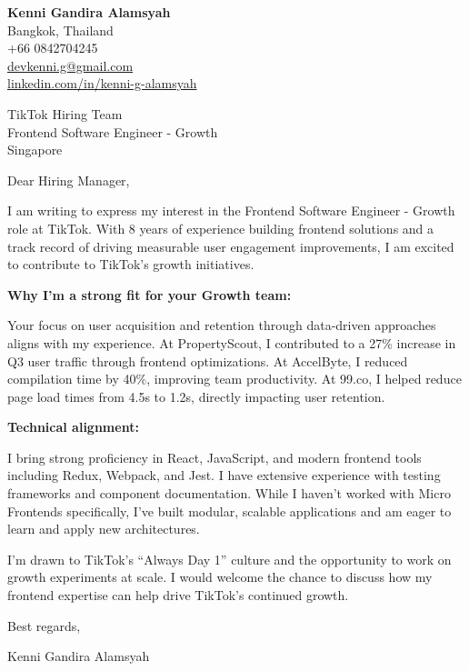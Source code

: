 \documentclass[12pt]{article}
\begin{document}
\begin{flushleft}
\textbf{\Large Kenni Gandira Alamsyah}\\
Bangkok, Thailand\\
+66 0842704245\\
\href{mailto:devkenni.g@gmail.com}{devkenni.g@gmail.com}\\
\href{https://www.linkedin.com/in/kenni-g-alamsyah}{linkedin.com/in/kenni-g-alamsyah}
\end{flushleft}

\vspace{1em}

\begin{flushleft}
TikTok Hiring Team\\
Frontend Software Engineer - Growth\\
Singapore
\end{flushleft}

\vspace{1em}

Dear Hiring Manager,

\vspace{0.5em}

I am writing to express my interest in the Frontend Software Engineer - Growth role at TikTok. With 8 years of experience building frontend solutions and a track record of driving measurable user engagement improvements, I am excited to contribute to TikTok's growth initiatives.

\vspace{0.5em}

\textbf{Why I'm a strong fit for your Growth team:}

\vspace{0.3em}

Your focus on user acquisition and retention through data-driven approaches aligns with my experience. At PropertyScout, I contributed to a 27\% increase in Q3 user traffic through frontend optimizations. At AccelByte, I reduced compilation time by 40\%, improving team productivity. At 99.co, I helped reduce page load times from 4.5s to 1.2s, directly impacting user retention.

\vspace{0.5em}

\textbf{Technical alignment:}

\vspace{0.3em}

I bring strong proficiency in React, JavaScript, and modern frontend tools including Redux, Webpack, and Jest. I have extensive experience with testing frameworks and component documentation. While I haven't worked with Micro Frontends specifically, I've built modular, scalable applications and am eager to learn and apply new architectures.

\vspace{0.5em}

I'm drawn to TikTok's ``Always Day 1'' culture and the opportunity to work on growth experiments at scale. I would welcome the chance to discuss how my frontend expertise can help drive TikTok's continued growth.

\vspace{1em}

Best regards,

\vspace{0.5em}

Kenni Gandira Alamsyah
\end{document}
